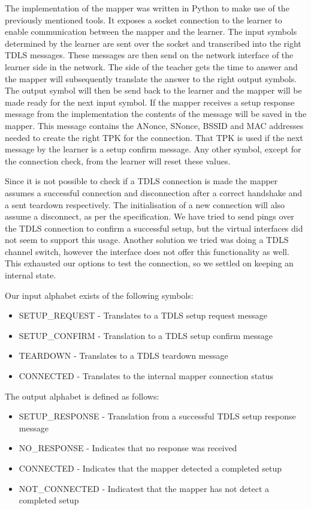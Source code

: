 The implementation of the mapper was written in Python to make use of the previously mentioned tools. It exposes a socket connection to the learner to enable communication between the mapper and the learner. The input symbols determined by the learner are sent over the socket and transcribed into the right TDLS messages. These messages are then send on the network interface of the learner side in the network.
The side of the teacher gets the time to answer and the mapper will subsequently translate the answer to the right output symbols. The output symbol will then be send back to the learner and the mapper will be made ready for the next input symbol. If the mapper receives a setup response message from the implementation the contents of the message will be saved in the mapper. This message contains the ANonce, SNonce, BSSID and MAC addresses needed to create the right TPK for the connection. That TPK is used if the next message by the learner is a setup confirm message. Any other symbol, except for the connection check, from the learner will reset these values.

Since it is not possible to check if a TDLS connection is made the mapper assumes a successful connection and disconnection after a correct handshake and a sent teardown respectively. The initialisation of a new connection will also assume a disconnect, as per the specification. We have tried to send pings over the TDLS connection to confirm a successful setup, but the virtual interfaces did not seem to support this usage. Another solution we tried was doing a TDLS channel switch, however the interface does not offer this functionality as well. This exhausted our options to test the connection, so we settled on keeping an internal state.

Our input alphabet exists of the following symbols: 
\begin{itemize}
	\item SETUP\_REQUEST - Translates to a TDLS setup request message
	\item SETUP\_CONFIRM - Translation to a TDLS setup confirm message
	\item TEARDOWN - Translates to a TDLS teardown message
	\item CONNECTED - Translates to the internal mapper connection status
\end{itemize}

The output alphabet is defined as follows:
\begin{itemize}
	\item SETUP\_RESPONSE - Translation from a successful TDLS setup response message
	\item NO\_RESPONSE - Indicates that no response was received
	\item CONNECTED - Indicates that the mapper detected a completed setup
	\item NOT\_CONNECTED - Indicatest that the mapper has not detect a completed setup
\end{itemize}

